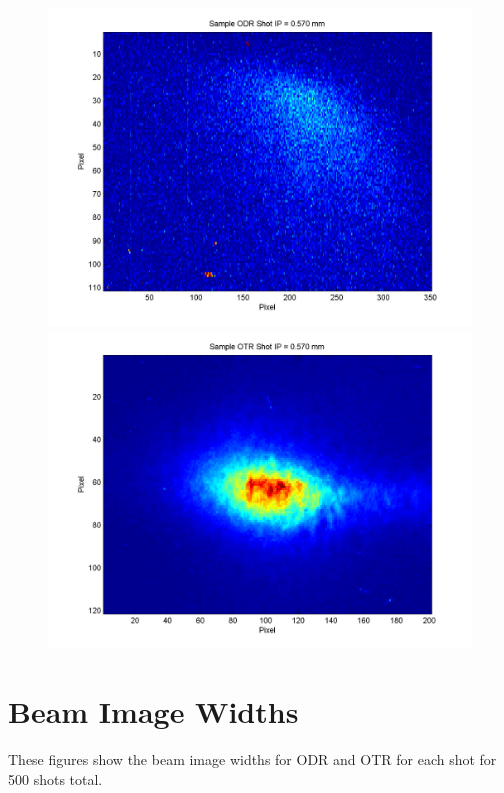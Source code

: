 \documentclass[12pt]{article}
\begin{document}
\begin{figure}
\begin{center}
\includegraphics[scale=0.5]{Figures/Sample_ODR_570.PNG}
\includegraphics[scale=0.5]{Figures/Sample_OTR_570.PNG}
\caption{}
\end{center}
\end{figure}



\newpage

\section{Beam Image Widths}

These figures show the beam image widths for ODR and OTR for each shot for 500 shots total.
\end{document}

